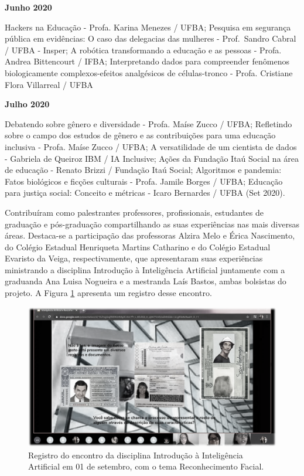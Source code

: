 \documentclass[
]{book}
\begin{document}
\textbf{Junho 2020}

Hackers na Educação - Profa. Karina Menezes / UFBA; Pesquisa em segurança pública em evidências: O caso das delegacias das mulheres - Prof.~Sandro Cabral / UFBA - Insper; A robótica transformando a educação e as pessoas - Profa. Andrea Bittencourt / IFBA; Interpretando dados para compreender fenômenos biologicamente complexos-efeitos analgésicos de células-tronco - Profa. Cristiane Flora Villarreal / UFBA

\textbf{Julho 2020}

Debatendo sobre gênero e diversidade - Profa. Maíse Zucco / UFBA; Refletindo sobre o campo dos estudos de gênero e as contribuições para uma educação inclusiva - Profa. Maíse Zucco / UFBA; A versatilidade de um cientista de dados - Gabriela de Queiroz IBM / IA Inclusive; Ações da Fundação Itaú Social na área de educação - Renato Brizzi / Fundação Itaú Social; Algoritmos e pandemia: Fatos biológicos e ficções culturais - Profa. Jamile Borges / UFBA; Educação para justiça social: Conceito e métricas - Icaro Bernardes / UFBA (Set 2020).

Contribuíram como palestrantes professores, profissionais, estudantes de graduação e pós-graduação compartilhando as suas experiências nas mais diversas áreas. Destaca-se a participação das professoras Alzira Melo e Érica Nascimento, do Colégio Estadual Henriqueta Martins Catharino e do Colégio Estadual Evaristo da Veiga, respectivamente, que apresentaram suas experiências ministrando a disciplina Introdução à Inteligência Artificial juntamente com a graduanda Ana Luisa Nogueira e a mestranda Laís Bastos, ambas bolsistas do projeto. A Figura \ref{fig:cafe} apresenta um registro desse encontro.

\begin{figure}
\includegraphics[width=17.78in]{images/image121} \caption{Registro do encontro da disciplina Introdução à Inteligência Artificial em 01 de setembro, com o tema Reconhecimento Facial.}\label{fig:cafe}
\end{figure}
\end{document}
